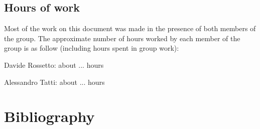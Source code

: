 \documentclass{article}
\begin{document}
	\subsection{Hours of work}

	Most of the work on this document was made in the presence of both members of the group. The approximate number of hours worked by each member of the group is as follow (including hours spent in group work):
	
	\bigskip
	Davide Rossetto: about ... hours
	
	Alessandro Tatti: about ... hours

	
	\section{Bibliography}
	
\end{document}
